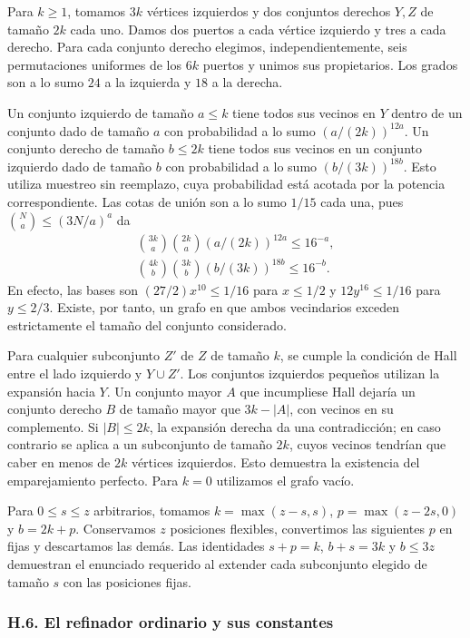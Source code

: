 \documentclass[spanish,11pt,a4paper]{article}
\begin{document}
Para \(k\ge1\), tomamos \(3k\) vértices izquierdos y dos conjuntos derechos \(Y,Z\) de tamaño \(2k\) cada uno. Damos dos puertos a cada vértice izquierdo y tres a cada derecho. Para cada conjunto derecho elegimos, independientemente, seis permutaciones uniformes de los \(6k\) puertos y unimos sus propietarios. Los grados son a lo sumo \(24\) a la izquierda y \(18\) a la derecha.

Un conjunto izquierdo de tamaño \(a\le k\) tiene todos sus vecinos en \(Y\) dentro de un conjunto dado de tamaño \(a\) con probabilidad a lo sumo \((a/(2k))^{12a}\). Un conjunto derecho de tamaño \(b\le2k\) tiene todos sus vecinos en un conjunto izquierdo dado de tamaño \(b\) con probabilidad a lo sumo \((b/(3k))^{18b}\). Esto utiliza muestreo sin reemplazo, cuya probabilidad está acotada por la potencia correspondiente. Las cotas de unión son a lo sumo \(1/15\) cada una, pues \(\binom Na\le(3N/a)^a\) da \[\begin{gathered}
\binom{3k}{a}\binom{2k}{a}(a/(2k))^{12a}\le16^{-a},\\
\binom{4k}{b}\binom{3k}{b}(b/(3k))^{18b}\le16^{-b}.
\end{gathered}\] En efecto, las bases son \((27/2)x^{10}\le1/16\) para \(x\le1/2\) y \(12y^{16}\le1/16\) para \(y\le2/3\). Existe, por tanto, un grafo en que ambos vecindarios exceden estrictamente el tamaño del conjunto considerado.

Para cualquier subconjunto \(Z'\) de \(Z\) de tamaño \(k\), se cumple la condición de Hall entre el lado izquierdo y \(Y\cup Z'\). Los conjuntos izquierdos pequeños utilizan la expansión hacia \(Y\). Un conjunto mayor \(A\) que incumpliese Hall dejaría un conjunto derecho \(B\) de tamaño mayor que \(3k-|A|\), con vecinos en su complemento. Si \(|B|\le2k\), la expansión derecha da una contradicción; en caso contrario se aplica a un subconjunto de tamaño \(2k\), cuyos vecinos tendrían que caber en menos de \(2k\) vértices izquierdos. Esto demuestra la existencia del emparejamiento perfecto. Para \(k=0\) utilizamos el grafo vacío.

Para \(0\le s\le z\) arbitrarios, tomamos \(k=\max(z-s,s)\), \(p=\max(z-2s,0)\) y \(b=2k+p\). Conservamos \(z\) posiciones flexibles, convertimos las siguientes \(p\) en fijas y descartamos las demás. Las identidades \(s+p=k\), \(b+s=3k\) y \(b\le3z\) demuestran el enunciado requerido al extender cada subconjunto elegido de tamaño \(s\) con las posiciones fijas.

\subsubsection{H.6. El refinador ordinario y sus constantes}\label{h.6.-el-refinador-ordinario-y-sus-constantes}
\end{document}
